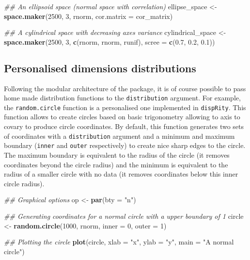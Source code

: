 \documentclass[
]{book}
\newenvironment{Shaded}{\begin{snugshade}}{\end{snugshade}}
\newcommand{\CommentTok}[1]{\textcolor[rgb]{0.56,0.35,0.01}{\textit{#1}}}
\newcommand{\DataTypeTok}[1]{\textcolor[rgb]{0.13,0.29,0.53}{#1}}
\newcommand{\DecValTok}[1]{\textcolor[rgb]{0.00,0.00,0.81}{#1}}
\newcommand{\FloatTok}[1]{\textcolor[rgb]{0.00,0.00,0.81}{#1}}
\newcommand{\KeywordTok}[1]{\textcolor[rgb]{0.13,0.29,0.53}{\textbf{#1}}}
\newcommand{\NormalTok}[1]{#1}
\newcommand{\StringTok}[1]{\textcolor[rgb]{0.31,0.60,0.02}{#1}}
\begin{document}
\begin{Shaded}
\begin{Highlighting}[]
\CommentTok{\#\# An ellipsoid space (normal space with correlation)}
\NormalTok{ellipse\_space \textless{}{-}}\StringTok{ }\KeywordTok{space.maker}\NormalTok{(}\DecValTok{2500}\NormalTok{, }\DecValTok{3}\NormalTok{, rnorm,}
                             \DataTypeTok{cor.matrix =}\NormalTok{ cor\_matrix)}

\CommentTok{\#\# A cylindrical space with decreasing axes variance}
\NormalTok{cylindrical\_space \textless{}{-}}\StringTok{ }\KeywordTok{space.maker}\NormalTok{(}\DecValTok{2500}\NormalTok{, }\DecValTok{3}\NormalTok{, }\KeywordTok{c}\NormalTok{(rnorm, rnorm, runif),}
                                 \DataTypeTok{scree =} \KeywordTok{c}\NormalTok{(}\FloatTok{0.7}\NormalTok{, }\FloatTok{0.2}\NormalTok{, }\FloatTok{0.1}\NormalTok{))}
\end{Highlighting}
\end{Shaded}

\hypertarget{personalised-dimensions-distributions}{%
\subsection{Personalised dimensions distributions}\label{personalised-dimensions-distributions}}

Following the modular architecture of the package, it is of course possible to pass home made distribution functions to the \texttt{distribution} argument.
For example, the \texttt{random.circle} function is a personalised one implemented in \texttt{dispRity}.
This function allows to create circles based on basic trigonometry allowing to axis to covary to produce circle coordinates.
By default, this function generates two sets of coordinates with a \texttt{distribution} argument and a minimum and maximum boundary (\texttt{inner} and \texttt{outer} respectively) to create nice sharp edges to the circle.
The maximum boundary is equivalent to the radius of the circle (it removes coordinates beyond the circle radius) and the minimum is equivalent to the radius of a smaller circle with no data (it removes coordinates below this inner circle radius).

\begin{Shaded}
\begin{Highlighting}[]
\CommentTok{\#\# Graphical options}
\NormalTok{op \textless{}{-}}\StringTok{ }\KeywordTok{par}\NormalTok{(}\DataTypeTok{bty =} \StringTok{"n"}\NormalTok{)}

\CommentTok{\#\# Generating coordinates for a normal circle with a upper boundary of 1}
\NormalTok{circle \textless{}{-}}\StringTok{ }\KeywordTok{random.circle}\NormalTok{(}\DecValTok{1000}\NormalTok{, rnorm, }\DataTypeTok{inner =} \DecValTok{0}\NormalTok{, }\DataTypeTok{outer =} \DecValTok{1}\NormalTok{)}

\CommentTok{\#\# Plotting the circle}
\KeywordTok{plot}\NormalTok{(circle, }\DataTypeTok{xlab =} \StringTok{"x"}\NormalTok{, }\DataTypeTok{ylab =} \StringTok{"y"}\NormalTok{, }\DataTypeTok{main =} \StringTok{"A normal circle"}\NormalTok{)}
\end{Highlighting}
\end{Shaded}
\end{document}
